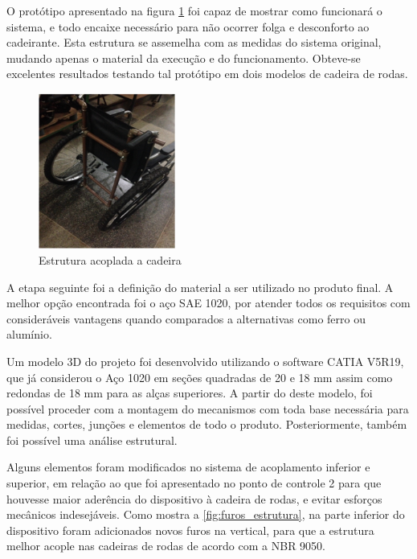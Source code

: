 O protótipo apresentado na figura \ref{fig:estr_prototipo} foi capaz de mostrar como funcionará o sistema, e todo encaixe necessário para não ocorrer folga e desconforto ao cadeirante. Esta estrutura se assemelha com as medidas do sistema original, mudando apenas o material da execução e do funcionamento. Obteve-se excelentes resultados testando tal protótipo em dois modelos de cadeira de rodas.

\begin{figure}[!htb]
\centering
\includegraphics[width=0.4\textwidth]{figuras/resultados/estr_prototipo}
\caption{Estrutura acoplada a cadeira}
\label{fig:estr_prototipo}
\end{figure}

A etapa seguinte foi a definição do material a ser utilizado no produto final. A melhor opção encontrada foi o aço SAE 1020, por atender todos os requisitos com consideráveis vantagens quando comparados a alternativas como ferro ou alumínio.

Um modelo 3D do projeto foi desenvolvido utilizando o software CATIA V5R19, que já considerou o Aço 1020 em seções quadradas de 20 e 18 mm assim como redondas de 18 mm para as alças superiores. A partir do deste modelo, foi possível proceder com a montagem do mecanismos com toda base necessária para medidas, cortes, junções e elementos de todo o produto. Posteriormente, também foi possível uma análise estrutural.

Alguns elementos foram modificados no sistema de acoplamento inferior e superior, em relação ao que foi apresentado no ponto de controle 2 para que houvesse maior aderência do dispositivo à cadeira de rodas, e evitar esforços mecânicos indesejáveis. Como mostra a \ref{fig:furos_estrutura}, na parte inferior do dispositivo foram adicionados novos furos na vertical, para que a estrutura melhor acople nas cadeiras de rodas de acordo com a NBR 9050.

